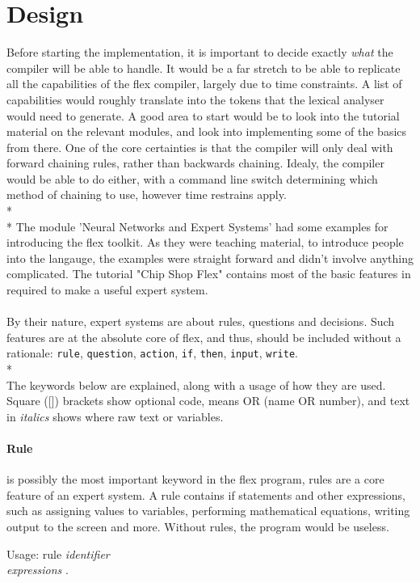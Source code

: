 \documentclass[12pt]{report}
\begin{document}
\section{Design}\label{sec:design}
Before starting the implementation, it is important to decide exactly \textit{what} the compiler will be able to handle.  It would be a far stretch to be able to replicate all the capabilities of the flex compiler, largely due to time constraints.  A list of capabilities would roughly translate into the tokens that the lexical analyser would need to generate.  A good area to start would be to look into the tutorial material on the relevant modules, and look into implementing some of the basics from there.  One of the core certainties is that the compiler will only deal with forward chaining rules, rather than backwards chaining.  Idealy, the compiler would be able to do either, with a command line switch determining which method of chaining to use, however time restrains apply.\\*
\\*
The module 'Neural Networks and Expert Systems' had some examples for introducing the flex toolkit.  As they were teaching material, to introduce people into the langauge, the examples were straight forward and didn't involve anything complicated.  The tutorial "Chip Shop Flex" contains most of the basic features in required to make a useful expert system.
\\
\\
By their nature, expert systems are about rules, questions and decisions.  Such features are at the absolute core of flex, and thus, should be included without a rationale: \texttt{rule}, \texttt{question}, \texttt{action}, \texttt{if}, \texttt{then}, \texttt{input}, \texttt{write}.\\*
\\
The keywords below are explained, along with a usage of how they are used.  Square ([]) brackets show optional code, \textbar \space means OR (name OR number), and text in \textit{italics} shows where raw text or variables.
\paragraph{Rule} is possibly the most important keyword in the flex program, rules are a core feature of an expert system.  A rule contains if statements and other expressions, such as assigning values to variables, performing mathematical equations, writing output to the screen and more.  Without rules, the program would be useless.\\
\begin{tabbing}
	Usage: rule \= \textit{identifier}\\
	\> \textit{expressions} .\\
\end{tabbing}
\end{document}
